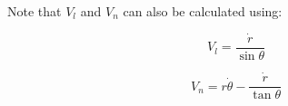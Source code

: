 \noindent Note that $V_{l}$ and $V_{n}$ can also be calculated using:

\begin{equation}
    V_{l} = \frac{\dot{r}}{\sin{\theta}}
    \label{eq:q3_a19}
\end{equation}

\begin{equation}
    V_{n} = r\dot{\theta} - \frac{\dot{r}}{\tan{\theta}}
    \label{eq:q3_a20}
\end{equation}
